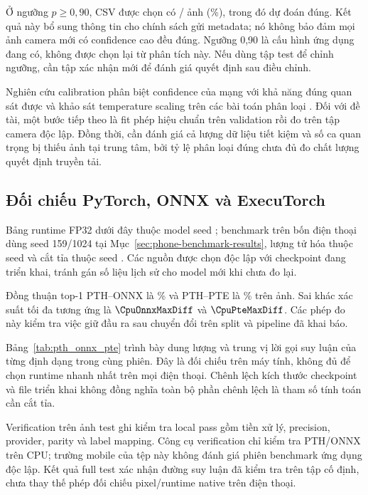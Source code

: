 Ở ngưỡng $p\geq0{,}90$, CSV được chọn có \HighConfidenceCount/\ImageTest{} ảnh (\HighConfidenceCoverage\%), trong đó \HighConfidenceCorrect{} dự đoán đúng. Kết quả này bổ sung thông tin cho chính sách gửi metadata; nó không bảo đảm mọi ảnh camera mới có confidence cao đều đúng. Ngưỡng 0,90 là cấu hình ứng dụng đang có, không được chọn lại từ phân tích này. Nếu dùng tập test để chỉnh ngưỡng, cần tập xác nhận mới để đánh giá quyết định sau điều chỉnh.

Nghiên cứu calibration phân biệt confidence của mạng với khả năng đúng quan sát được và khảo sát temperature scaling trên các bài toán phân loại \citep{guo2017calibration}. Đối với đề tài, một bước tiếp theo là fit phép hiệu chuẩn trên validation rồi đo trên tập camera độc lập. Đồng thời, cần đánh giá cả lượng dữ liệu tiết kiệm và số ca quan trọng bị thiếu ảnh tại trung tâm, bởi tỷ lệ phân loại đúng chưa đủ đo chất lượng quyết định truyền tải.

\subsection{Đối chiếu PyTorch, ONNX và ExecuTorch}
Bảng runtime FP32 dưới đây thuộc model seed \BenchmarkSeed{}; benchmark trên bốn điện thoại dùng seed 159/1024 tại Mục~\ref{sec:phone-benchmark-results}, lượng tử hóa thuộc seed \QuantizationSeed{} và cắt tỉa thuộc seed \PruningSeed{}. Các nguồn được chọn độc lập với checkpoint đang triển khai, tránh gán số liệu lịch sử cho model mới khi chưa đo lại.



Đồng thuận top-1 PTH--ONNX là \CpuOnnxAgreement\% và PTH--PTE là \CpuPteAgreement\% trên \ImageTest{} ảnh. Sai khác xác suất tối đa tương ứng là $\CpuOnnxMaxDiff$ và $\CpuPteMaxDiff$. Các phép đo này kiểm tra việc giữ đầu ra sau chuyển đổi trên split và pipeline đã khai báo.

Bảng~\ref{tab:pth_onnx_pte} trình bày dung lượng và trung vị lời gọi suy luận của từng định dạng trong cùng phiên. Đây là đối chiếu trên máy tính, không đủ để chọn runtime nhanh nhất trên mọi điện thoại. Chênh lệch kích thước checkpoint và file triển khai không đồng nghĩa toàn bộ phần chênh lệch là tham số tính toán cần cắt tỉa.

Verification trên \VerificationSamples{} ảnh test ghi \VerificationPassedChecks{} kiểm tra local pass gồm tiền xử lý, precision, provider, parity và label mapping. Công cụ verification chỉ kiểm tra PTH/ONNX trên CPU; trường mobile của tệp này không đánh giá phiên benchmark ứng dụng độc lập. Kết quả full test xác nhận đường suy luận đã kiểm tra trên tập cố định, chưa thay thế phép đối chiếu pixel/runtime native trên điện thoại.

